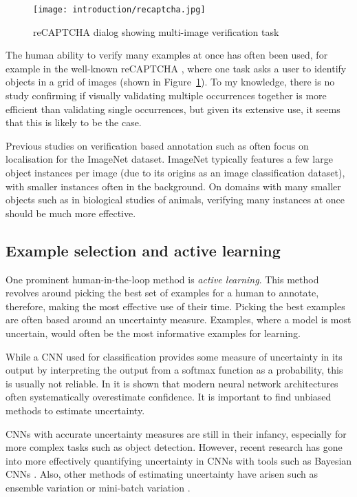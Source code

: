 \begin{figure}[ht]
  \centering
  \texttt{[image: introduction/recaptcha.jpg]}
  \caption{reCAPTCHA dialog showing multi-image verification task}  
  \label{fig:captcha}
\end{figure}

The human ability to verify many examples at once has often been used, for example in the well-known reCAPTCHA \cite{von2008recaptcha}, where one task asks a user to identify objects in a grid of images (shown in Figure~\ref{fig:captcha}). To my knowledge, there is no study confirming if visually validating multiple occurrences together is more efficient than validating single occurrences, but given its extensive use, it seems that this is likely to be the case.

Previous studies on verification based annotation such as \cite{Papadopoulos2016} often focus on localisation for the ImageNet dataset. ImageNet typically features a few large object instances per image (due to its origins as an image classification dataset), with smaller instances often in the background. On domains with many smaller objects such as in biological studies of animals, verifying many instances at once should be much more effective. 

\subsection{Example selection and active learning} 

One prominent human-in-the-loop method is \emph{active learning}. This method revolves around picking the best set of examples for a human to annotate, therefore, making the most effective use of their time. Picking the best examples are often based around an uncertainty measure. Examples, where a model is most uncertain, would often be the most informative examples for learning. 
 
While a \gls{CNN} used for classification provides some measure of uncertainty in its output by interpreting the output from a softmax function as a probability, this is usually not reliable. In \cite{Guo2017} it is shown that modern neural network architectures often systematically overestimate confidence. It is important to find unbiased methods to estimate uncertainty.

\gls{CNN}s with accurate uncertainty measures are still in their infancy, especially for more complex tasks such as object detection. However, recent research has gone into more effectively quantifying uncertainty in \gls{CNN}s with tools such as Bayesian \gls{CNN}s \cite{Gal2017}. Also, other methods of estimating uncertainty have arisen such as ensemble variation \cite{Beluch2018} or mini-batch variation \cite{Chang2017}.

